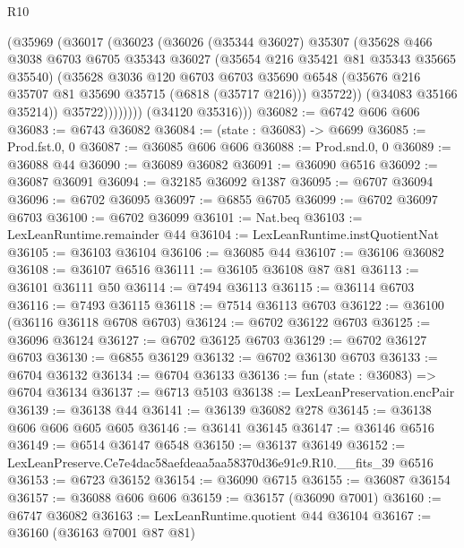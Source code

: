 \begin{lexlean}{R10}
\begin{coremodule}
                  (@35969
                    (@36017
                      (@36023
                        (@36026
                          (@35344 @36027)
                          @35307
                          (@35628
                            @466
                            @3038
                            @6703
                            @6705
                            @35343
                            @36027
                            (@35654 @216 @35421 @81 @35343 @35665 @35540)
                            (@35628
                              @3036
                              @120
                              @6703
                              @6703
                              @35690
                              @6548
                              (@35676 @216 @35707 @81 @35690 @35715 (@6818 (@35717 @216)))
                              @35722))
                          (@34083 @35166 @35214))
                        @35722))))))))
        (@34120 @35316)))
@36082 := @6742 @606 @606
@36083 := @6743 @36082
@36084 := (state : @36083) -> @6699
@36085 := Prod.fst.{0, 0}
@36087 := @36085 @606 @606
@36088 := Prod.snd.{0, 0}
@36089 := @36088 @44
@36090 := @36089 @36082
@36091 := @36090 @6516
@36092 := @36087 @36091
@36094 := @32185 @36092 @1387
@36095 := @6707 @36094
@36096 := @6702 @36095
@36097 := @6855 @6705
@36099 := @6702 @36097 @6703
@36100 := @6702 @36099
@36101 := Nat.beq
@36103 := LexLeanRuntime.remainder @44
@36104 := LexLeanRuntime.instQuotientNat
@36105 := @36103 @36104
@36106 := @36085 @44
@36107 := @36106 @36082
@36108 := @36107 @6516
@36111 := @36105 @36108 @87 @81
@36113 := @36101 @36111 @50
@36114 := @7494 @36113
@36115 := @36114 @6703
@36116 := @7493 @36115
@36118 := @7514 @36113 @6703
@36122 := @36100 (@36116 @36118 @6708 @6703)
@36124 := @6702 @36122 @6703
@36125 := @36096 @36124
@36127 := @6702 @36125 @6703
@36129 := @6702 @36127 @6703
@36130 := @6855 @36129
@36132 := @6702 @36130 @6703
@36133 := @6704 @36132
@36134 := @6704 @36133
@36136 := fun (state : @36083) => @6704 @36134
@36137 := @6713 @5103
@36138 := LexLeanPreservation.encPair
@36139 := @36138 @44
@36141 := @36139 @36082 @278
@36145 := @36138 @606 @606 @605 @605
@36146 := @36141 @36145
@36147 := @36146 @6516
@36149 := @6514 @36147 @6548
@36150 := @36137 @36149
@36152 := LexLeanPreserve.Ce7e4dac58aefdeaa5aa58370d36e91c9.R10.__fits_39 @6516
@36153 := @6723 @36152
@36154 := @36090 @6715
@36155 := @36087 @36154
@36157 := @36088 @606 @606
@36159 := @36157 (@36090 @7001)
@36160 := @6747 @36082
@36163 := LexLeanRuntime.quotient @44 @36104
@36167 := @36160 (@36163 @7001 @87 @81)

\end{coremodule}
\end{lexlean}
